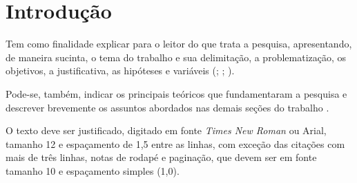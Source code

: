 \chapter{Introdução}

Tem como finalidade explicar para o leitor do que trata a pesquisa, apresentando, de maneira sucinta, o tema do trabalho e sua delimitação, a problematização, os objetivos, a justificativa, as hipóteses e variáveis (\cite{andrade}; \cite{koche}; \cite{medeiros}).

Pode-se, também, indicar os principais teóricos que fundamentaram a pesquisa e descrever brevemente os assuntos abordados nas demais seções do trabalho \cite{medeiros}.

O texto deve ser justificado, digitado em fonte \textit{Times New Roman} ou Arial, tamanho 12 e espaçamento de 1,5 entre as linhas, com exceção das citações com mais de três linhas, notas de rodapé e paginação, que devem ser em fonte tamanho 10 e espaçamento simples (1,0).